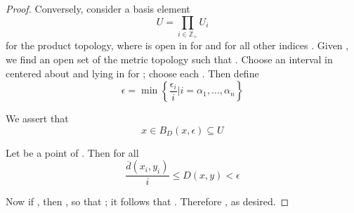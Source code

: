 \begin{proof}
      Conversely, consider a basis element
      \begin{equation*}
            U = \prod_{i \in \mathbb{Z}_{+}} U_{i}
      \end{equation*}
      for the product topology, where  is open in  for  and  for all other indices . Given , we find an open set  of the metric topology such that . Choose an interval  in  centered about  and lying in  for ; choose each . Then define
      \begin{equation*}
            \epsilon = \min \left\{
                  \frac{\epsilon_{i}}{i} | i = \alpha_{1},\dots,\alpha_{n}
            \right\}
      \end{equation*}

      We assert that
      \begin{equation*}
            x \in B_{D}(x,\epsilon) \subseteq U
      \end{equation*}

      Let  be a point of . Then for all 
      \begin{equation*}
            \frac{\overline{d}(x_{i},y_{i})}{i} \le D(x,y) < \epsilon
      \end{equation*}

      Now if , then , so that ; it follows that . Therefore , as desired.

\end{proof}
